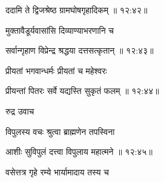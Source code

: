 
{\devanagarifont ददामि ते द्विजश्रेष्ठ ग्रामघोषगृहादिकम् {॥ १२:४२॥} \veg\dontdisplaylinenum }%

{\devanagarifont मुक्तावैडूर्यवासांसि दिव्याण्याभरणानि च \thinspace{\dandab} \dontdisplaylinenum }%


{\devanagarifont सर्वान्गृहाण विप्रेन्द्र श्रद्धया दत्तसत्कृतान् {॥ १२:४३॥} \veg\dontdisplaylinenum }%

{\devanagarifont प्रीयतां भगवान्धर्मः प्रीयतां च महेश्वरः \thinspace{\dandab} \dontdisplaylinenum }%


{\devanagarifont प्रीयन्तां पितरः सर्वे यद्यस्ति सुकृतं फलम् {॥ १२:४४॥} \veg\dontdisplaylinenum }%

{\devanagarifont रुद्र उवाच {\dandab}\dontdisplaylinenum  }%

{\devanagarifont विपुलस्य वचः श्रुत्वा ब्राह्मणेन तपस्विना \thinspace{\danda} \dontdisplaylinenum }%


{\devanagarifont आशीः सुविपुलं दत्त्वा विपुलाय महात्मने {॥ १२:४५॥} \veg\dontdisplaylinenum }%
 
{\devanagarifont वसेत्तत्र गृहे रम्ये भार्यामादाय तस्य च \thinspace{\dandab} \dontdisplaylinenum }%

